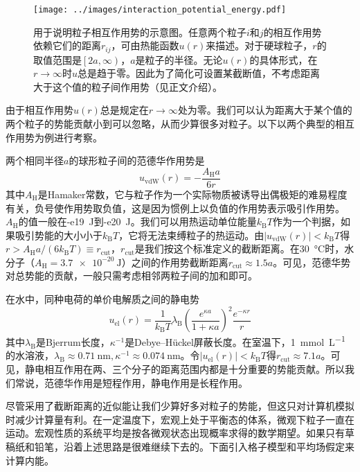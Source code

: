 \documentclass[main.tex]{subfiles}
\begin{document}
\begin{figure}[ht]
    \centering
    \texttt{[image: ../images/interaction\_potential\_energy.pdf]}
    \caption{用于说明粒子相互作用势的示意图。任意两个粒子$i$和$j$的相互作用势依赖它们的距离$r_{ij}$，可由热能函数$u\left(r\right)$来描述。对于硬球粒子，$r$的取值范围是$\left[2a,\infty\right)$，$a$是粒子的半径。无论$u\left(r\right)$的具体形式，在$r\rightarrow \infty$时$u$总是趋于零。因此为了简化可设置某截断值，不考虑距离大于这个值的粒子间作用势（见正文介绍）。}
    \label{fig:interaction_potential_energy}
\end{figure}

由于相互作用势$u\left(r\right)$总是规定在$r\rightarrow\infty$处为零。我们可以认为距离大于某个值的两个粒子的势能贡献小到可以忽略，从而少算很多对粒子。以下以两个典型的相互作用势为例进行考察。

两个相同半径$a$的球形粒子间的范德华作用势是
\[u_\text{vdW}\left(r\right)=-\frac{A_\text{H}a}{6r}\]
其中$A_\text{H}$是Hamaker常数，它与粒子作为一个实际物质被诱导出偶极矩的难易程度有关，负号使作用势取负值，这是因为惯例上以负值的作用势表示吸引作用势。$A_\text{H}$的值一般在\qty{-e19}{\joule}到\qty{-e20}{\joule}。我们可以用热运动单位能量$k_\text{B}T$作为一个判据，如果吸引势能的大小小于$k_\text{B}T$，它将无法束缚粒子的热运动。由$\left|u_\text{vdW}\left(r\right)\right|<k_\text{B}T$得$r>A_\text{H}a/\left(6k_\text{B}T\right)\equiv r_\text{cut}$，$r_\text{cut}$是我们按这个标准定义的截断距离。在\qty{30}{\degreeCelsius}时，水分子（$A_\text{H}=\qty{3.7e-20}{\joule}$）之间的作用势截断距离$r_\text{cut}\approx 1.5a$。可见，范德华势对总势能的贡献，一般只需考虑相邻两粒子间的加和即可。

在水中，同种电荷的单价电解质之间的静电势
\[u_\text{el}\left(r\right)=\frac{1}{k_\text{B}T}\lambda_\text{B}\left(\frac{e^{\kappa a}}{1+\kappa a}\right)^2\frac{e^{-\kappa r}}{r}\]
其中$\lambda_\text{B}$是Bjerrum长度，$\kappa^{-1}$是Debye--Hückel屏蔽长度。在室温下，\qty{1}{\milli\mole\per\liter}的水溶液，$\lambda_\text{B}\approx\qty{0.71}{\nano\meter},\kappa^{-1}\approx\qty{0.074}{\nano\meter}$。令$\left|u_\text{el}\left(r\right)\right|<k_\text{B}T$得$r_\text{cut}\approx \num{7.1}a$。可见，静电相互作用在两、三个分子的距离范围内都是十分重要的势能贡献。所以我们常说，范德华作用是短程作用，静电作用是长程作用。

尽管采用了截断距离的近似能让我们少算好多对粒子的势能，但这只对计算机模拟时减少计算量有利。在一定温度下，宏观上处于平衡态的体系，微观下粒子一直在运动。宏观性质的系统平均是按各微观状态出现概率求得的数学期望。如果只有草稿纸和铅笔，沿着上述思路是很难继续下去的。下面引入格子模型和平均场假定来计算内能。
\end{document}
